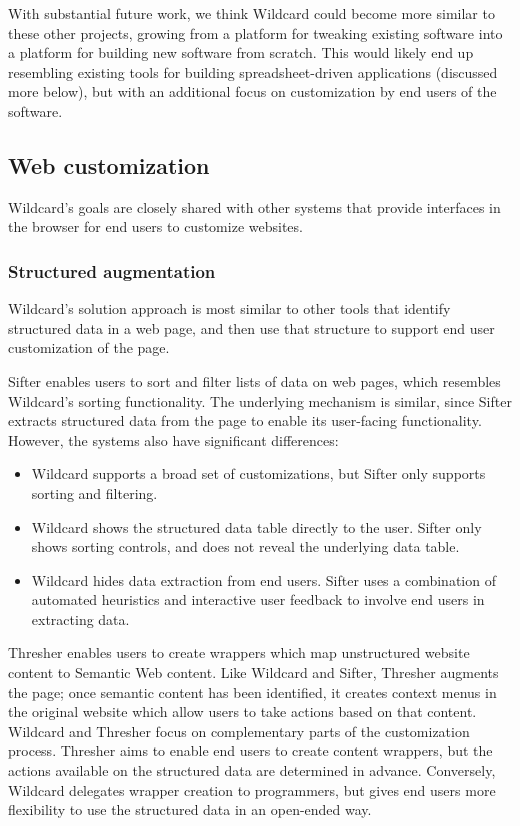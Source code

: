 \documentclass[english,submission]{programming}
\providecommand{\tightlist}{%
  \setlength{\itemsep}{0pt}\setlength{\parskip}{0pt}}
\begin{document}
With substantial future work, we think Wildcard could become more
similar to these other projects, growing from a platform for tweaking
existing software into a platform for building new software from
scratch. This would likely end up resembling existing tools for building
spreadsheet-driven applications (discussed more below), but with an
additional focus on customization by end users of the software.

\hypertarget{web-customization}{%
\subsection{Web customization}\label{web-customization}}

Wildcard's goals are closely shared with other systems that provide
interfaces in the browser for end users to customize websites.

\hypertarget{structured-augmentation}{%
\subsubsection{Structured augmentation}\label{structured-augmentation}}

Wildcard's solution approach is most similar to other tools that
identify structured data in a web page, and then use that structure to
support end user customization of the page.

Sifter \autocite{huynh2006} enables users to sort and filter lists of
data on web pages, which resembles Wildcard's sorting functionality. The
underlying mechanism is similar, since Sifter extracts structured data
from the page to enable its user-facing functionality. However, the
systems also have significant differences:

\begin{itemize}
\tightlist
\item
  Wildcard supports a broad set of customizations, but Sifter only
  supports sorting and filtering.
\item
  Wildcard shows the structured data table directly to the user. Sifter
  only shows sorting controls, and does not reveal the underlying data
  table.
\item
  Wildcard hides data extraction from end users. Sifter uses a
  combination of automated heuristics and interactive user feedback to
  involve end users in extracting data.
\end{itemize}

Thresher \autocite{hogue2005} enables users to create wrappers which map
unstructured website content to Semantic Web content. Like Wildcard and
Sifter, Thresher augments the page; once semantic content has been
identified, it creates context menus in the original website which allow
users to take actions based on that content. Wildcard and Thresher focus
on complementary parts of the customization process. Thresher aims to
enable end users to create content wrappers, but the actions available
on the structured data are determined in advance. Conversely, Wildcard
delegates wrapper creation to programmers, but gives end users more
flexibility to use the structured data in an open-ended way.
\end{document}
